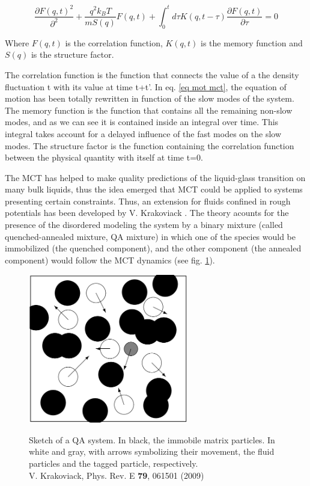 \documentclass[a4paper,12pt]{article}
\newcommand{\jline}{\vspace{10pt}}
\begin{document}
\begin{equation}
\label{eq mot mct}
\frac{\partial F(q,t)^2}{\partial^2}+\frac{q^2k_BT}{mS(q)}F(q,t)+\int_0^t d\tau K(q,t-\tau) \frac{\partial F(q,t)}{\partial \tau}=0
\end{equation}

Where $F(q,t)$ is the correlation function, $K(q,t)$ is the memory function and $S(q)$ is the structure factor.\jline

The correlation function is the function that connects the value of a the density fluctuation t with its value at time t+t'.
In eq. \ref{eq mot mct}, the equation of motion has been totally rewritten in function of the slow modes of the system. The memory
function is the function that contains all the remaining non-slow modes, and as we can see it is contained inside an integral 
over time. This integral takes account for a delayed influence of the fast modes on the slow modes. The structure factor is 
the function containing the correlation function between the physical quantity with itself at time t=0.\jline

The MCT has helped to make quality predictions of the liquid-glass transition on many bulk liquids, thus the idea emerged that MCT could
be applied to systems presenting certain constraints. Thus, an extension for fluids confined in rough potentials has been developed by
V. Krakoviack \cite{Krakoviack2005,Krakoviack2005a,Krakoviack2007,Krakoviack2009}. The theory acounts for the presence of the disordered 
modeling the system by a binary mixture (called quenched-annealed mixture, QA mixture) in which one of the species would be immobilized 
(the quenched component), and the other component (the annealed component) would follow the MCT dynamics (see fig. \ref{qa mixture}).

\begin{figure}[htbp]
\centering
\subfigure
{\includegraphics[width=7cm]{pics/qa_mixtures.png}}
\caption{Sketch of a QA system. In black, the immobile matrix particles. In white and gray, with arrows symbolizing their movement, the 
fluid particles and the tagged particle, respectively.\\V. Krakoviack, Phys. Rev. E \textbf{79}, 061501 (2009)}
\label{qa mixture}
\end{figure}
\end{document}
